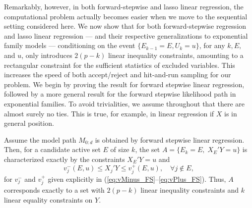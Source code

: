 \documentclass{article}
\begin{document}
Remarkably, however, in both forward-stepwise and lasso linear regression, the computational problem actually becomes easier when we move to the sequential setting considered here. We now show that for both forward-stepwise regression and lasso linear regression --- and their respective generalizations to exponential family models --- conditioning on the event $\{E_{k-1}=E, U_k=u\}$, for any $k, E,$ and $u$, only introduces $2(p-k)$ linear inequality constraints, amounting to a rectangular constraint for the sufficient statistics of excluded variables. This increases the speed of both accept/reject and hit-and-run sampling for our problem. We begin by proving the result for forward stepwise linear regression, followed by a more general result for the forward stepwise likelihood path in exponential families. To avoid trivialities, we assume throughout that there are almost surely no ties. This is true, for example, in linear regression if $X$ is in general position. 

\begin{theorem}
  Assume the model path $M_{0:d}$ is obtained by forward stepwise 
  linear regression. Then, for a candidate active set $E$ of size $k$, 
  the set $A = \{E_k = E, \;X_E'Y = u\}$ is characterized 
  exactly by the constraints $X_E'Y=u$ and
  \[
  v_j^-(E,u) \leq X_j'Y \leq v_j^+(E,u), \quad\forall j \notin E,
  \]
  for $v_j^-$ and $v_j^+$ given explicitly in (\ref{eq:vMinus_FS}--\ref{eq:vPlus_FS}).  Thus, $A$ corresponds exactly to a set with $2(p-k)$ linear inequality constraints and $k$ linear equality constraints on $Y$.
\end{theorem}
\end{document}

